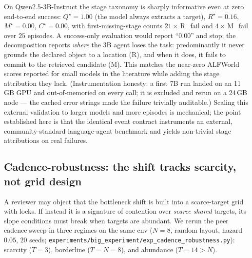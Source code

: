 \documentclass{article}
\newcommand{\method}[1]{\texttt{#1}}
\begin{document}
On Qwen2.5-3B-Instruct the stage taxonomy is sharply informative even at zero
end-to-end success: $Q^\star{=}1.00$ (the model always extracts a target),
$R^\star{=}0.16$, $M^\star{=}0.00$, $C^\star{=}0.00$, with first-missing-stage
counts $21\times$\,R\_fail and $4\times$\,M\_fail over $25$ episodes. A success-only
evaluation would report ``$0.00$'' and stop; the decomposition reports
\emph{where} the 3B agent loses the task: predominantly it never grounds the
declared object to a location (R), and when it does, it fails to commit to the
retrieved candidate (M). This matches the near-zero ALFWorld scores reported
for small models in the literature while adding the stage attribution they
lack. (Instrumentation honesty: a first 7B run landed on an 11\,GB GPU and
out-of-memoried on every call; it is excluded and rerun on a 24\,GB node ---
the cached error strings made the failure trivially auditable.) Scaling this
external validation to larger models and more episodes is mechanical; the
point established here is that the identical event contract instruments an
external, community-standard language-agent benchmark and yields non-trivial
stage attributions on real failures.

\subsection{Cadence-robustness: the shift tracks scarcity, not grid design}
\label{app:cadence-robustness}

A reviewer may object that the bottleneck shift is built into a scarce-target
grid with locks. If instead it is a signature of contention over \emph{scarce
shared} targets, its slope conditions must break when targets are abundant. We
rerun the peer cadence sweep in three regimes on the same env ($N{=}8$, random
layout, hazard $0.05$, $20$ seeds; \method{experiments/big\_experiment/exp\_cadence\_robustness.py}):
scarcity ($T{=}3$), borderline ($T{=}N{=}8$), and abundance ($T{=}14{>}N$).
\end{document}
